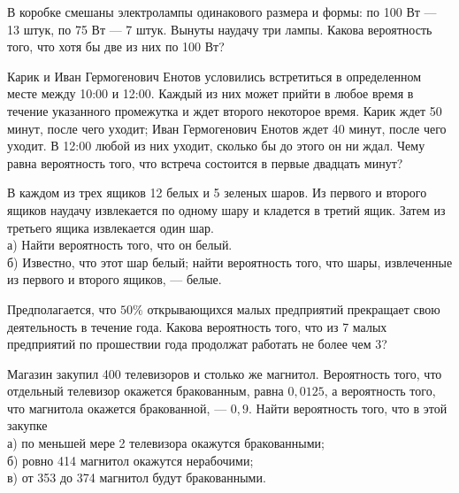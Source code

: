 \newpage\setcounter{zad}{0}



\begin{zkrW}{20}\noindent 
	В коробке смешаны электролампы одинакового размера и формы: по 100 Вт --- 13 штук, по 75 Вт --- 7 штук. Вынуты наудачу три лампы. Какова вероятность того, что хотя бы две из них по 100 Вт?
 
\end{zkrW}

\begin{zkrW}{20}\noindent 
	Карик и Иван Гермогенович Енотов условились встретиться в определенном месте между 10:00 и 12:00. Каждый из них может прийти в любое время в течение указанного промежутка и ждет второго некоторое время. Карик ждет 50 минут, после чего уходит; Иван Гермогенович Енотов ждет 40 минут, после чего уходит. В 12:00 любой из них уходит, сколько бы до этого он ни ждал. Чему равна вероятность того, что встреча состоится в первые двадцать минут?
 
\end{zkrW}

\begin{zkrW}{20}\noindent 
	В каждом из трех ящиков 12 белых и 5 зеленых шаров. Из первого и второго ящиков наудачу извлекается по одному шару и кладется в третий ящик. Затем из третьего ящика извлекается один шар. \\ \indent а) Найти вероятность того, что он белый. \\ \indent б) Известно, что этот шар белый; найти вероятность того, что шары, извлеченные из первого и второго ящиков, --- белые.
 
\end{zkrW}

\begin{zkrW}{20}\noindent 
	Предполагается, что $50\%$ открывающихся малых предприятий прекращает свою деятельность в течение года. Какова вероятность того, что из 7 малых предприятий по прошествии года продолжат работать не более чем 3?
 
\end{zkrW}

\begin{zkrW}{20}\noindent 
	Магазин закупил 400 телевизоров и столько же магнитол. Вероятность того, что отдельный телевизор окажется бракованным, равна $0{,}0125$, а вероятность того, что магнитола окажется бракованной, --- $0{,}9$. Найти вероятность того, что в этой закупке \\ \indent а) по меньшей мере 2 телевизора окажутся бракованными; \\ \indent б) ровно 414 магнитол окажутся нерабочими; \\ \indent в) от 353 до 374 магнитол будут бракованными.
 
\end{zkrW}

